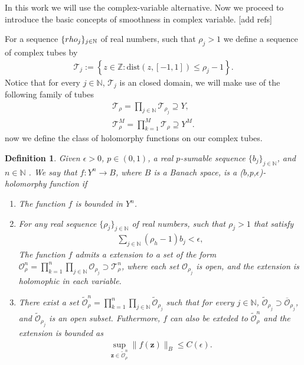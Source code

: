 \documentclass{article}
\newtheorem{definition}[theorem]{Definition}
\newcommand{\todo}[1]{{\color{red}[#1]}}
\newcommand{\IN}{{\mathbb N}}
\newcommand{\IZ}{{\mathbb Z}}
\begin{document}
In this work we will use the complex-variable alternative. Now we proceed to introduce the basic concepts of smoothness in complex variable. \todo{add refs}

For a sequence $\{\\rho_j\}_{j \in \IN}$ of real numbers, such that $\rho_j  >1$ we define a sequence of complex tubes by 
\begin{align*}
\mathcal{T}_j := \left\lbrace z \in \IZ : \text{dist}(z,[-1,1]) \leq \rho_j-1 \right\rbrace.
\end{align*}
Notice that for every $j \in \IN$, $\mathcal{T}_j$ is an closed domain, we will make use of the following family of tubes 
\begin{align*}
\mathcal{T}_{\rho} = \prod_{j \in \IN} \mathcal{T}_{\rho_j} \supseteq Y, \\
\mathcal{T}^M_{\rho} = \prod_{k=1}^M \mathcal{T}_{\rho} \supseteq Y^M.
\end{align*}
now we define the class of holomorphy functions  on our complex tubes. 
\begin{definition}
Given $\epsilon >0$, $p \in (0,1)$, a real $p$-sumable sequence $\{b_j\}_{j \in \IN}$, and $n \in \IN$ . We say that $f:Y^n\rightarrow B$, where $B$ is a Banach space, is a ($b$,p,$\epsilon$)-holomorphy function if
\begin{enumerate}
\item The function $f$ is bounded in $Y^n$.
\item 
For any real sequence $\{\rho_j\}_{j \in \IN}$ of real numbers, such that $\rho_j  >1$ that satisfy 
\begin{align*}
\sum_{j \in \IN} (\rho_h -1) b_j < \epsilon, 
\end{align*}
The function $f$ admits a extension to a set of the form $\mathcal{O}^n_\rho = \prod_{k=1}^n \prod_{j \in \IN} \mathcal{O}_{\rho_j} \supset \mathcal{T}^n_\rho$, where each set $\mathcal{O}_{\rho_j}$ is open, and the extension is holomophic in each variable. 
\item 
There exist a set $\widetilde{\mathcal{O}}_\rho^n =  \prod_{k=1}^n \prod_{j \in \IN} \widetilde{\mathcal{O}}_{\rho_j}$ such that for every $j \in \IN$, $\widetilde{\mathcal{O}}_{\rho_j} \supset \overline{\mathcal{O}}_{\rho_j}$, and $\widetilde{\mathcal{O}}_{\rho_j}$ is an open subset. Futhermore, $f$ can also be exteded to $\widetilde{\mathcal{O}}_\rho^n$ and the extension is bounded as 
\begin{align*}
\sup_{\mathbf{z} \in \widetilde{\mathcal{O}}_\rho^n } \| f(\mathbf{z})\|_B \leq C(\epsilon).
\end{align*}
\end{enumerate}
\end{definition}
\end{document}
